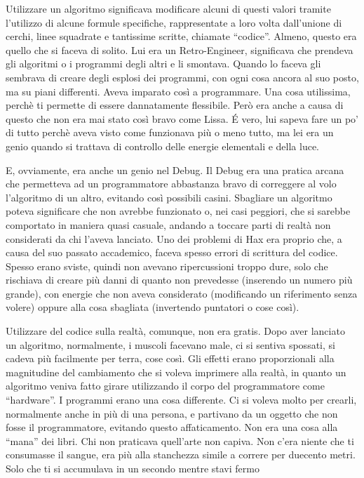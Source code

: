     Utilizzare un algoritmo significava modificare alcuni di questi valori
    tramite l'utilizzo di alcune formule specifiche, rappresentate a loro
    volta dall'unione di cerchi, linee squadrate e tantissime scritte,
    chiamate ``codice''. Almeno, questo era
    quello che si faceva di solito. Lui era un Retro-Engineer, significava
    che prendeva gli algoritmi o i programmi degli altri e li smontava.
    Quando lo faceva gli sembrava di creare degli esplosi dei programmi,
    con ogni cosa ancora al suo posto, ma su piani differenti. Aveva
    imparato così a programmare. Una cosa utilissima, perchè ti permette di
    essere dannatamente flessibile. Però era anche a causa di questo che
    non era mai stato così bravo come Lissa. \'E vero, lui sapeva fare un
    po' di tutto perchè aveva visto come funzionava più o meno tutto, ma
    lei era un genio quando si trattava di controllo delle energie
    elementali e della luce.

    E, ovviamente, era anche un genio nel Debug. Il Debug era una pratica
    arcana che permetteva ad un programmatore abbastanza bravo di
    correggere al volo l'algoritmo di un altro, evitando così possibili
    casini. Sbagliare un algoritmo poteva significare che non avrebbe
    funzionato o, nei casi peggiori, che si sarebbe comportato in maniera
    quasi casuale, andando a toccare parti di realtà non considerati da chi
    l'aveva lanciato. Uno dei problemi di Hax era proprio che, a causa
    del suo passato accademico, faceva spesso errori di scrittura del
    codice. Spesso erano sviste, quindi non avevano ripercussioni troppo
    dure, solo che rischiava di creare più danni di quanto non prevedesse
    (inserendo un numero più grande), con energie che non aveva considerato
    (modificando un riferimento senza volere) oppure alla cosa sbagliata
    (invertendo puntatori o cose così).

    Utilizzare del codice sulla realtà, comunque, non era gratis. Dopo aver
    lanciato un algoritmo, normalmente, i muscoli facevano male, ci si
    sentiva spossati, si cadeva più facilmente per terra, cose così. Gli
    effetti erano proporzionali alla magnitudine del cambiamento che si
    voleva imprimere alla realtà, in quanto un algoritmo veniva fatto
    girare utilizzando il corpo del programmatore come ``hardware''. I
    programmi erano una cosa differente. Ci si voleva molto per crearli,
    normalmente anche in più di una persona, e partivano da un oggetto che
    non fosse il programmatore, evitando questo affaticamento. Non era una
    cosa alla ``mana'' dei libri. Chi non praticava quell'arte non capiva.
    Non c'era niente che ti consumasse il sangue, era più alla stanchezza simile a correre
    per duecento metri. Solo che ti si accumulava in un secondo mentre
    stavi fermo

